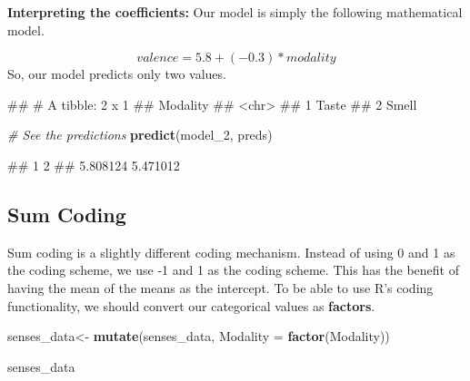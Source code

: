\documentclass[
]{book}
\newenvironment{Shaded}{\begin{snugshade}}{\end{snugshade}}
\newcommand{\AttributeTok}[1]{\textcolor[rgb]{0.13,0.29,0.53}{#1}}
\newcommand{\CommentTok}[1]{\textcolor[rgb]{0.56,0.35,0.01}{\textit{#1}}}
\newcommand{\FunctionTok}[1]{\textcolor[rgb]{0.13,0.29,0.53}{\textbf{#1}}}
\newcommand{\NormalTok}[1]{#1}
\newcommand{\OtherTok}[1]{\textcolor[rgb]{0.56,0.35,0.01}{#1}}
\newcommand{\SpecialCharTok}[1]{\textcolor[rgb]{0.81,0.36,0.00}{\textbf{#1}}}
\begin{document}
\textbf{Interpreting the coefficients:} Our model is simply the following mathematical model.

\[valence = 5.8 + (−0.3) * modality\]
So, our model predicts only two values.

\begin{Shaded}
\end{Shaded}

\begin{Shaded}
\begin{Highlighting}[]
\NormalTok{\#\# \# A tibble: 2 x 1}
\NormalTok{\#\#   Modality}
\NormalTok{\#\#   \textless{}chr\textgreater{}   }
\NormalTok{\#\# 1 Taste   }
\NormalTok{\#\# 2 Smell}
\end{Highlighting}
\end{Shaded}

\begin{Shaded}
\begin{Highlighting}[]
\CommentTok{\# See the predictions}
\FunctionTok{predict}\NormalTok{(model\_2, preds)}
\end{Highlighting}
\end{Shaded}

\begin{Shaded}
\begin{Highlighting}[]
\NormalTok{\#\#        1        2 }
\NormalTok{\#\# 5.808124 5.471012}
\end{Highlighting}
\end{Shaded}

\subsection{Sum Coding}\label{sum-coding}

Sum coding is a slightly different coding mechanism. Instead of using 0 and 1 as the coding scheme, we use -1 and 1 as the coding scheme. This has the benefit of having the mean of the means as the intercept. To be able to use R's coding functionality, we should convert our categorical values as \textbf{factors}.

\begin{Shaded}
\begin{Highlighting}[]
\NormalTok{senses\_data}\OtherTok{\textless{}{-}} \FunctionTok{mutate}\NormalTok{(senses\_data, }\AttributeTok{Modality =} \FunctionTok{factor}\NormalTok{(Modality))}

\NormalTok{senses\_data}
\end{Highlighting}
\end{Shaded}
\end{document}
